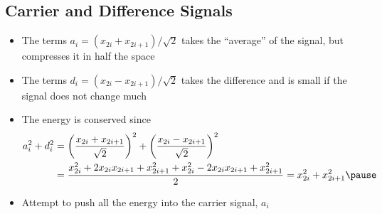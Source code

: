 
\begin{slide}
\section[-2]{Carrier and Difference Signals}

\begin{PauseHighLight}
  \begin{itemize}
  \item The terms $a_i = (x_{2i} + x_{2i+1})/\sqrt{2}$ takes the
    ``average'' of the signal, but compresses it in half the space\pause
  \item The terms $d_i = (x_{2i} - x_{2i+1})/\sqrt{2}$ takes the
    difference and is small if the signal does not change much\pause
  \item The energy is conserved since 
    {\small
      \begin{align*}
        a_i^2 + d_i^2 &= \left(\frac{x_{2i} + x_{2i+1}}{\sqrt{2}}\right)^2
        + \left(\frac{x_{2i} - x_{2i+1}}{\sqrt{2}}\right)^2 \\
        &= \frac{x_{2i}^2 + 2 x_{2i}x_{2i+1} + x_{2i+1}^2 + x_{2i}^2 - 2
          x_{2i}x_{2i+1} + x_{2i+1}^2}{2} = x_{2i}^2 + x_{2i+1}^2\pause
      \end{align*}}
  \item Attempt to push all the energy into the carrier signal, $a_i$\pause
  \end{itemize}
\end{PauseHighLight}

\end{slide}


